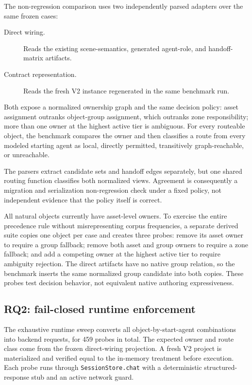 The non-regression comparison uses two independently parsed adapters over the
same frozen cases:

\begin{description}
  \item[Direct wiring.] Reads the existing scene-semantics, generated
  agent-role, and handoff-matrix artifacts.
  \item[Contract representation.] Reads the fresh V2 instance regenerated in
  the same benchmark run.
\end{description}

Both expose a normalized ownership graph and the same decision policy:
asset assignment outranks object-group assignment, which outranks zone
responsibility; more than one owner at the highest active tier is ambiguous.
For every routeable object, the benchmark compares the owner and then classifies
a route from every modeled starting agent as local, directly permitted,
transitively graph-reachable, or unreachable.

The parsers extract candidate sets and handoff edges separately, but one shared
routing function classifies both normalized views.  Agreement is consequently
a migration and serialization non-regression check under a fixed policy, not
independent evidence that the policy itself is correct.

All natural objects currently have asset-level owners.  To exercise the entire
precedence rule without misrepresenting corpus frequencies, a separate derived
suite copies one object per case and creates three probes: remove its asset
owner to require a group fallback; remove both asset and group owners to
require a zone fallback; and add a competing owner at the highest active tier
to require ambiguity rejection.  The direct artifacts have no native group
relation, so the benchmark inserts the same normalized group candidate into
both copies.  These probes test decision behavior, not equivalent native
authoring expressiveness.

\subsection{RQ2: fail-closed runtime enforcement}

The exhaustive runtime sweep converts all object-by-start-agent combinations
into backend requests, for 459 probes in total.  The expected owner and route
class come from the frozen direct-wiring projection.  A fresh V2 project is
materialized and verified equal to the in-memory treatment before execution.
Each probe runs through \texttt{SessionStore.chat} with a deterministic
structured-response stub and an active network guard.

